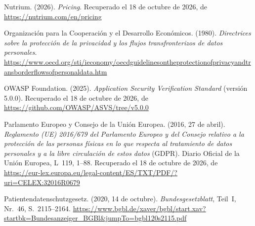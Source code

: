 \documentclass[12pt, a4paper]{article}
\begin{document}
\begin{list}{}{\setlength{\leftmargin}{1.27cm}\setlength{\itemindent}{-1.27cm}%
  \setlength{\labelwidth}{0pt}\setlength{\labelsep}{0pt}\setlength{\itemsep}{6pt}}
\item Nutrium. (2026). \textit{Pricing}.
  Recuperado el 18 de octubre de 2026, de \url{https://nutrium.com/en/pricing}

\item Organización para la Cooperación y el Desarrollo Económicos.
  (1980). \textit{Directrices sobre la protección de la privacidad
  y los flujos transfronterizos de datos personales}.
\url{https://www.oecd.org/sti/ieconomy/oecdguidelinesontheprotectionofprivacyandtransborderflowsofpersonaldata.htm}

\item OWASP Foundation. (2025). \textit{Application Security
  Verification Standard} (versión 5.0.0).
  Recuperado el 18 de octubre de 2026, de \url{https://github.com/OWASP/ASVS/tree/v5.0.0}
 




\item Parlamento Europeo y Consejo de la Unión Europea. (2016,
  27 de abril). \textit{Reglamento (UE) 2016/679 del Parlamento
  Europeo y del Consejo relativo a la protección de las personas
  físicas en lo que respecta al tratamiento de datos personales
  y a la libre circulación de estos datos} (GDPR).
  Diario Oficial de la Unión Europea, L~119, 1--88.
  Recuperado el 18 de octubre de 2026, de \url{https://eur-lex.europa.eu/legal-content/ES/TXT/PDF/?uri=CELEX:32016R0679}


\item Patientendatenschutzgesetz. (2020, 14 de octubre).
  \textit{Bundesgesetzblatt}, Teil~I, Nr.~46, S.~2115--2164.
  \url{https://www.bgbl.de/xaver/bgbl/start.xav?startbk=Bundesanzeiger_BGBl&jumpTo=bgbl120s2115.pdf}



\end{list}
\end{document}
